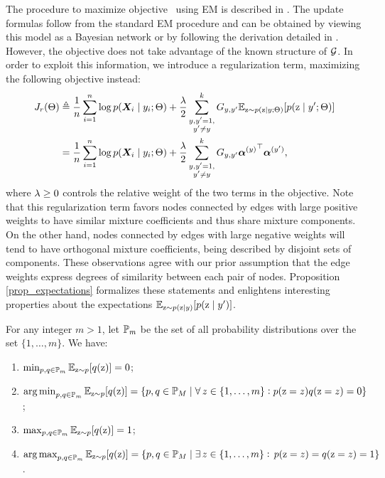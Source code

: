 The procedure to maximize objective~ using EM is described in . The update formulas follow from the standard EM procedure and can be obtained by viewing this model as a Bayesian network or by following the derivation detailed in . However, the objective  does not take advantage of the known structure of ${\mathcal{G}}$. In order to exploit this information, we introduce a regularization term, maximizing the following objective instead:
\begin{align}
\label{eq:spamhmm_objective}
J_r(\Theta) &\triangleq \frac{1}{n}\sum_{i=1}^n \log p({\bm{X}}_i \mid y_i; \Theta) + \frac{\lambda}{2} \sum_{\substack{y,y'=1,\\y'\neq y}}^{k} {G}_{y,y'} \mathbb{E}_{{\textnormal{z}} \sim p({\textnormal{z}} \mid y; \Theta)} [ p({\textnormal{z}} \mid y'; \Theta) ] \nonumber\\
&= \frac{1}{n}\sum_{i=1}^n \log p({\bm{X}}_i \mid y_i; \Theta) + \frac{\lambda}{2} \sum_{\substack{y,y'=1,\\y'\neq y}}^{k} {G}_{y,y'} {{\bm{\alpha}}^{(y)}}^\top {\bm{\alpha}}^{(y')},
\end{align}
where $\lambda \geq 0$ controls the relative weight of the two terms in the objective. Note that this regularization term favors nodes connected by edges with large positive weights to have similar mixture coefficients and thus share mixture components. On the other hand, nodes connected by edges with large negative weights will tend to have orthogonal mixture coefficients, being described by disjoint sets of components. These observations agree with our prior assumption that the edge weights express degrees of similarity between each pair of nodes. Proposition \ref{prop_expectations} formalizes these statements and enlightens interesting properties about the expectations $\mathbb{E}_{{\textnormal{z}} \sim p({\textnormal{z}} \mid y)} [ p({\textnormal{z}} \mid y')]$.
\begin{proposition}
	\label{prop_expectations}
	For any integer $m>1$, let ${\mathbb{P}}_m$ be the set of all probability distributions over the set $\{1,\dots,m\}$. We have:
	\begin{enumerate}
		\item $\min_{p,q \in {\mathbb{P}}_m} \mathbb{E}_{{\textnormal{z}}\sim p} [ q({\textnormal{z}}) ] = 0$; \label{prop_min}
		\item $\operatorname*{arg\,min}_{p,q \in {\mathbb{P}}_m} \mathbb{E}_{{\textnormal{z}}\sim p} [ q({\textnormal{z}}) ] = \{p,q \in {\mathbb{P}}_M \mid \forall \, z \in \{1,\dots,m\}: p({\textnormal{z}} = z)q({\textnormal{z}} = z)=0\}$; \label{prop_argmin}
		\item $\max_{p,q \in {\mathbb{P}}_m} \mathbb{E}_{{\textnormal{z}}\sim p} [ q({\textnormal{z}}) ] = 1$; \label{prop_max}
		\item $\operatorname*{arg\,max}_{p,q \in {\mathbb{P}}_m} \mathbb{E}_{{\textnormal{z}}\sim p} [ q({\textnormal{z}}) ] = \{p,q \in {\mathbb{P}}_M \mid \exists \, z \in \{1,\dots,m\} : \, p({\textnormal{z}} = z)=q({\textnormal{z}} = z)=1\}$ \label{prop_argmax}.
	\end{enumerate}
\end{proposition}
